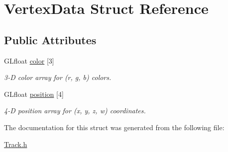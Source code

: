 \hypertarget{struct_vertex_data}{}\section{Vertex\+Data Struct Reference}
\label{struct_vertex_data}
\subsection*{Public Attributes}
\begin{DoxyCompactItemize}
\item 
\mbox{\label{struct_vertex_data_a305475959e3c612d733b423f55f16709}} 
G\+Lfloat \hyperlink{struct_vertex_data_a305475959e3c612d733b423f55f16709}{color} \mbox{[}3\mbox{]}
\begin{DoxyCompactList}\small\item\em 3-\/D color array for (r, g, b) colors. \end{DoxyCompactList}\item 
\mbox{\label{struct_vertex_data_ad1ef7bb4d1a61dd585fe64f3167c31d6}} 
G\+Lfloat \hyperlink{struct_vertex_data_ad1ef7bb4d1a61dd585fe64f3167c31d6}{position} \mbox{[}4\mbox{]}
\begin{DoxyCompactList}\small\item\em 4-\/D position array for (x, y, z, w) coordinates. \end{DoxyCompactList}\end{DoxyCompactItemize}


The documentation for this struct was generated from the following file\+:\begin{DoxyCompactItemize}
\item 
\hyperlink{_track_8h}{Track.\+h}\end{DoxyCompactItemize}
